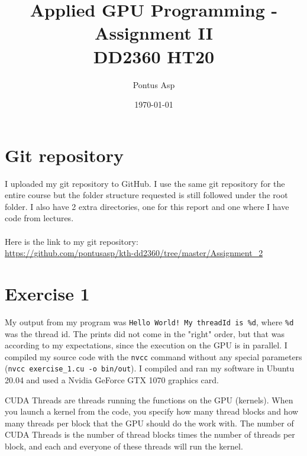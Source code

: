 \documentclass[a4paper, 12pt]{article}
\def\code#1{\texttt{#1}}
\begin{document}
\title{\vspace{4.0cm}Applied GPU Programming - Assignment II\\
\large DD2360 HT20}
\author{Pontus Asp}
\date{\today}
\maketitle
\thispagestyle{empty}
\newpage

\clearpage
{}

\section{Git repository}
I uploaded my git repository to GitHub. I use the same git repository for the entire course but the folder structure requested is still followed under the root folder. I also have 2 extra directories, one for this report and one where I have code from lectures.
\\\\
Here is the link to my git repository:\\
\url{https://github.com/pontusasp/kth-dd2360/tree/master/Assignment_2}



\section{Exercise 1}
My output from my program was \code{Hello World! My threadId is \%d}, where \code{\%d} was the thread id. The prints did not come in the "right" order, but that was according to my expectations, since the execution on the GPU is in parallel. I compiled my source code with the \code{nvcc} command without any special parameters (\code{nvcc exercise\_1.cu -o bin/out}). I compiled and ran my software in Ubuntu 20.04 and used a Nvidia GeForce GTX 1070 graphics card.\par CUDA Threads are threads running the functions on the GPU (kernels). When you launch a kernel from the code, you specify how many thread blocks and how many threads per block that the GPU should do the work with. The number of CUDA Threads is the number of thread blocks times the number of threads per block, and each and everyone of these threads will run the kernel.


\end{document}
